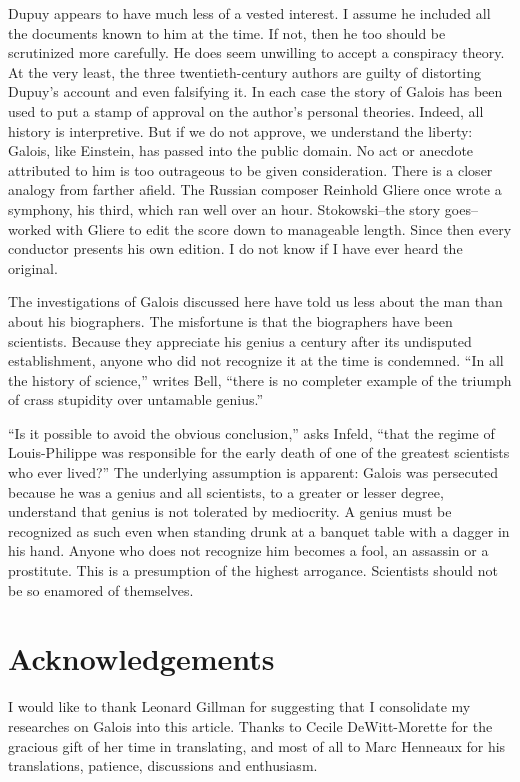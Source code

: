 \documentclass[12pt]{article}
\begin{document}
Dupuy appears to have much less of a vested interest. I assume he included all the documents known to him at the time. If not, then he too should be scrutinized more carefully. He does seem unwilling to accept a conspiracy theory. At the very least, the three twentieth-century authors are guilty of distorting Dupuy's account and even falsifying it. In each case the story of Galois has been used to put a stamp of approval on the author's personal theories. Indeed, all history is interpretive. But if we do not approve, we understand the liberty: Galois, like Einstein, has passed into the public domain. No act or anecdote attributed to him is too outrageous to be given consideration. There is a closer analogy from farther afield. The Russian composer Reinhold Gliere once wrote a symphony, his third, which ran well over an hour. Stokowski--the story goes--worked with Gliere to edit the score down to manageable length. Since then every conductor presents his own edition. I do not know if I have ever heard the original.

The investigations of Galois discussed here have told us less about the man than about his biographers. The misfortune is that the biographers have been scientists. Because they appreciate his genius a century after its undisputed establishment, anyone who did not recognize it at the time is condemned. ``In all the history of science,'' writes Bell, ``there is no completer example of the triumph of crass stupidity over untamable genius.'' 

``Is it possible to avoid the obvious conclusion,'' asks Infeld, ``that the regime of Louis-Philippe was responsible for the early death of one of the greatest scientists who ever lived?'' The underlying assumption is apparent: Galois was persecuted because he was a genius and all scientists, to a greater or lesser degree, understand that genius is not tolerated by mediocrity. A genius must be recognized as such even when standing drunk at a banquet table with a dagger in his hand. Anyone who does not recognize him becomes a fool, an assassin or a prostitute. This is a presumption of the highest arrogance. Scientists should not be so enamored of themselves.

\section*{Acknowledgements}

I would like to thank Leonard Gillman for suggesting that I consolidate my researches on Galois into this article. Thanks to Cecile DeWitt-Morette for the gracious gift of her time in translating, and most of all to Marc Henneaux for his translations, patience, discussions and enthusiasm.
\end{document}
